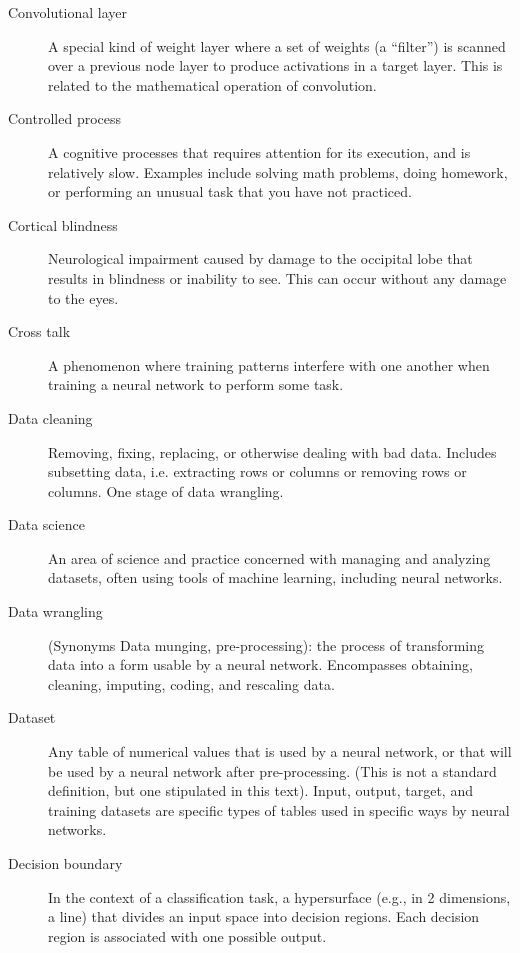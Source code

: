 \begin{description}
\item[Convolutional layer] A special kind of weight layer where a set of weights (a ``filter'') is scanned over a previous node layer to produce activations in a target layer. This is related to the mathematical operation of convolution.

\item[Controlled process] A cognitive processes that requires attention for its execution, and is relatively slow. Examples include solving math problems, doing homework, or performing an  unusual task that you have not practiced.

\item[Cortical blindness] Neurological impairment caused by damage to the occipital lobe that results in blindness or inability to see. This can occur without any damage to the eyes. 

\item[Cross talk] A phenomenon where training patterns interfere with one another when training a neural network to perform some task. 

\item[Data cleaning] Removing, fixing, replacing, or otherwise dealing with bad data. Includes subsetting data, i.e. extracting rows or columns or removing rows or columns. One stage of data wrangling.

\item[Data science]  An area of science and practice concerned with managing and analyzing datasets, often using tools of machine learning, including neural networks.

\item[Data wrangling] (Synonyms Data munging, pre-processing): the process of transforming data into a form usable by a neural network. Encompasses obtaining, cleaning, imputing, coding, and rescaling data. 

\item[Dataset] Any table of numerical values that is used by a neural network, or that will be used by a neural network after pre-processing. (This is not a standard definition, but one stipulated in this text). Input, output, target, and training datasets are specific types of tables used in specific ways by neural networks.

\item[Decision boundary] In the context of a classification task, a hypersurface (e.g., in 2 dimensions, a line) that divides an input space into decision regions. Each decision region is associated with one possible output.


\end{description}
